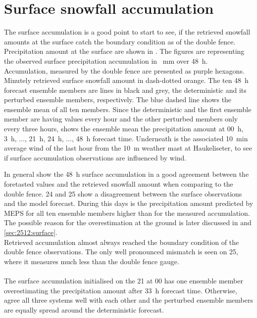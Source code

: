 \section{Surface snowfall accumulation}%
The surface accumulation is a good point to start to see, if the retrieved snowfall amounts at the surface catch the boundary condition as of the double fence. Precipitation amount at the surface are shown in . The figures are representing the observed surface precipitation accumulation in \SI{}{\mm} over \SI{48}{\hour}. Accumulation, measured by the double fence are presented as purple hexagons. Minutely retrieved surface snowfall amount in dash-dotted orange. The ten \SI{48}{\hour} forecast ensemble members are lines in black and grey, the deterministic and its perturbed ensemble members, respectively. The blue dashed line shows the ensemble mean of all ten members. Since the deterministic and the first ensemble member are having values every hour and the other perturbed members only every three hours, shows the ensemble mean the precipitation amount at 0\SI{0}{\hour}, \SI{3}{\hour}, $\ldots$, \SI{21}{\hour}, \SI{24}{\hour}, $\ldots$, \SI{48}{\hour} forecast time. 
Underneath is the associated \SI{10}{\minute} average wind of the last hour from the \SI{10}{\metre} weather mast at Haukeliseter, to see if surface accumulation observations are influenced by wind. 

\noindent
In general show the \SI{48}{\hour} surface accumulation in  a good agreement between the foretasted values and the retrieved snowfall amount when comparing to the double fence. \SI{24}{\dec} and \SI{25}{\dec} show a disagreement between the surface observations and the model forecast. During this days is the precipitation amount predicted by MEPS for all ten ensemble members higher than for the measured accumulation. The possible reason for the overestimation at the ground is later discussed in  and \ref{sec:2512:surface}. \\
Retrieved accumulation almost always reached the boundary condition of the double fence observations. The only well pronounced mismatch is seen on \SI{25}{\dec}, where it measures much less than the double fence gauge.  
\\ \\
The surface accumulation initialised on the \SI{21}{\dec} at 0\SI{0}{\UTC} has one ensemble member overestimating the precipitation amount after \SI{33}{\hour} forecast time. Otherwise, agree all three systems well with each other and the perturbed ensemble members are equally spread around the deterministic forecast.
